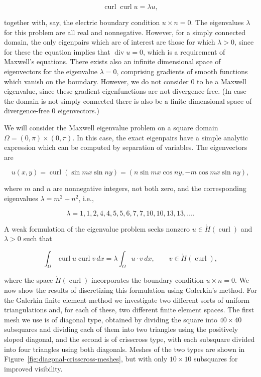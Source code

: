 \[
\operatorname{curl}\operatorname{curl}u=\lambda u,
\]

{together with, say, the electric boundary condition $u\times n=0$. The eigenvalues $\lambda$ for this problem are all real and nonnegative. However, for a simply connected domain, the only eigenpairs which are of interest are those for which $\lambda>0$, since for these the equation implies that $\operatorname{div}u=0$, which is a requirement of Maxwell's equations. There exists also an infinite dimensional space of eigenvectors for the eigenvalue $\lambda=0$, comprising gradients of smooth functions which vanish on the boundary. However, we do not consider 0 to be a Maxwell eigenvalue, since these gradient eigenfunctions are not divergence-free. (In case the domain is not simply connected there is also be a finite dimensional space of divergence-free 0 eigenvectors.)}

{We will consider the Maxwell eigenvalue problem on a square domain $\Omega=(0,\pi)\times(0,\pi)$. In this case, the exact eigenpairs have a simple analytic expression which can be computed by separation of variables. The eigenvectors are}

\[
u(x,y)=\operatorname{curl}(\sin mx\sin ny)=(n\sin mx\cos ny,-m\cos mx\sin ny),
\]

{where $m$ and $n$ are nonnegative integers, not both zero, and the corresponding eigenvalues $\lambda=m^2+n^2$, i.e.,}

\[
\lambda=1,1,2,4,4,5,5,6,7,7,10,10,13,13,\ldots.
\]

{A weak formulation of the eigenvalue problem seeks nonzero $u\in\mathring H(\operatorname{curl})$ and $\lambda>0$ such that}

\[
\int_\Omega\operatorname{curl}u\operatorname{curl}v\,dx=\lambda\int_\Omega u\cdot v\,dx,\qquad v\in\mathring H(\operatorname{curl}),
\]

{where the space $\mathring H(\operatorname{curl})$ incorporates the boundary condition $u\times n=0$. We now show the results of discretizing this formulation using Galerkin's method. For the Galerkin finite element method we investigate two different sorts of uniform triangulations and, for each of these, two different finite element spaces. The first mesh we use is of diagonal type, obtained by dividing the square into $40\times40$ subsquares and dividing each of them into two triangles using the positively sloped diagonal, and the second is of crisscross type, with each subsquare divided into four triangles using both diagonals. Meshes of the two types are shown in Figure~\ref{fig:diagonal-crisscross-meshes}, but with only $10\times10$ subsquares for improved visibility.}

